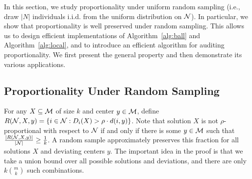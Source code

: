 In this section, we study proportionality under uniform random sampling (i.e., draw $|N|$ individuals i.i.d. from the uniform distribution on $\mathcal {N}$). In particular, we show that proportionality is well preserved under random sampling. This allows us to design efficient implementations of Algorithm~\ref{alg:ball} and Algorithm~\ref{alg:local}, and to introduce an efficient algorithm for auditing proportionality. %
We first present the general property and then demonstrate its various applications. 

\subsection{Proportionality Under Random Sampling}
For any $X \subseteq \mathcal{M}$ of size $k$ and center $y \in \mathcal{M}$, define $R(\mathcal {N}, X, y) = \{i \in \mathcal {N} : D_i(X) > \rho \cdot d(i,y) \}$. Note that solution $X$ is not $\rho$-proportional with respect to $\mathcal {N}$ if and only if there is some $y \in \mathcal{M}$ such that $\frac{|R(\mathcal {N},X,y)|}{|\mathcal {N}|} \geq \frac{1}{k}$. 
A random sample approximately preserves this fraction for all solutions $X$ and deviating centers $y$. The important idea in the proof is that we take a union bound over all possible solutions and deviations, and there are only $k {m \choose k}$ such combinations. 

